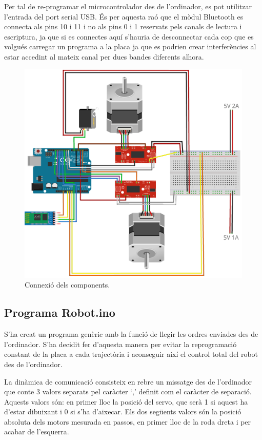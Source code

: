 Per tal de re-programar el microcontrolador des de l’ordinador, es pot utilitzar l’entrada del port serial USB. És per aquesta raó que el mòdul Bluetooth es connecta als pins 10 i 11 i no als pins 0 i 1 reservats pels canals de lectura i escriptura, ja que si es connectes aquí s’hauria de desconnectar cada cop que es volgués carregar un programa a la placa ja que es podrien crear interferències al estar accedint al mateix canal per dues bandes diferents alhora. 
\begin{figure}[H]
	\centering
	\includegraphics[scale=0.5]{RobotFritz}
	\caption{Connexió dels components.}
	\label{fig:connexio}
\end{figure}
\subsection{Programa Robot.ino}

S’ha creat un programa genèric amb la funció de llegir les ordres enviades des de l’ordinador. S’ha decidit fer d’aquesta manera per evitar la reprogramació constant de la placa a cada trajectòria i aconseguir així el control total del robot des de l’ordinador. 

La dinàmica de comunicació consisteix en rebre un missatge des de l’ordinador que conte 3 valors separats pel caràcter ‘,’ definit com el caràcter de separació. Aquests valors són: en primer lloc la posició del servo, que serà 1 si aquest ha d’estar dibuixant i 0 si s’ha d’aixecar. Els dos següents valors són la posició absoluta dels motors mesurada en passos, en primer lloc de la roda dreta i per acabar de l’esquerra. 

